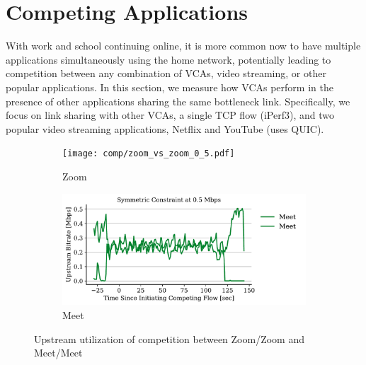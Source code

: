 \section{Competing Applications}
\label{sec:competition}
With work and school continuing online, it is more common now to have multiple applications simultaneously using the home network, potentially leading to competition between any combination of VCAs, video streaming, or other popular applications. In this section, we measure how VCAs perform in the presence of other applications sharing the same bottleneck link. Specifically, we focus on link sharing with other VCAs, a single TCP flow (iPerf3), and two popular video streaming applications, Netflix and YouTube (uses QUIC). 


\begin{figure}[t!]
\centering
\begin{subfigure}[t]{.35\textwidth}
    \centering
    \texttt{[image: comp/zoom\_vs\_zoom\_0\_5.pdf]}
    \caption{Zoom}
    \label{subfig:zoom_zoom_0_5}
\end{subfigure}\hfill
\begin{subfigure}[t]{.35\textwidth}
    \centering
    \includegraphics[width=1\textwidth]{figures/comp/meet_vs_meet_0_5.pdf}
    \caption{Meet}
    \label{subfig:meet_meet_0_5}
\end{subfigure}
\caption{Upstream utilization of competition between Zoom/Zoom and Meet/Meet}
\label{fig:meet-zoom-upld-0.5}
\end{figure}

